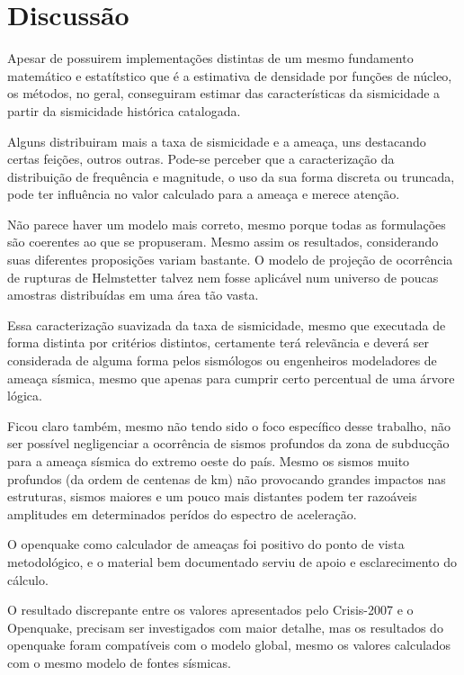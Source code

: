 \chapter{Discussão}
\label{cap:conclusoes}

Apesar de possuirem implementações distintas de um mesmo fundamento matemático e estatítstico
que é a estimativa de densidade por funções de núcleo, os métodos, no geral, conseguiram
estimar das características da sismicidade a partir da sismicidade histórica catalogada.

Alguns distribuiram mais a taxa de sismicidade e a ameaça, uns destacando certas feições, outros outras.
Pode-se perceber que a caracterização da distribuição de frequência e magnitude, o uso da sua forma discreta 
ou truncada, pode ter influência no valor calculado para a ameaça e merece atenção.

Não parece haver um modelo mais correto, mesmo
porque todas as formulações são coerentes ao que se propuseram. Mesmo assim
os resultados, considerando suas diferentes proposições variam bastante.
O modelo de projeção de ocorrência de rupturas de Helmstetter talvez nem
fosse aplicável num universo de poucas amostras distribuídas em uma área tão vasta.

Essa caracterização suavizada da taxa de sismicidade, mesmo que executada de forma
distinta por critérios distintos, certamente terá relevãncia e deverá ser considerada
de alguma forma pelos sismólogos ou engenheiros modeladores de ameaça sísmica,
mesmo que apenas para cumprir certo percentual de uma árvore lógica.

Ficou claro também, mesmo não tendo sido o foco específico desse trabalho, 
não ser possível negligenciar a ocorrência de sismos profundos da zona de 
subducção para a ameaça sísmica do extremo oeste do país. Mesmo os sismos muito profundos (da ordem de centenas de km)
não provocando grandes impactos nas estruturas, sismos maiores e um pouco mais distantes podem ter razoáveis amplitudes em determinados perídos do espectro de aceleração.

O openquake como calculador de ameaças foi positivo do ponto de vista metodológico,
e o material bem documentado serviu de apoio e esclarecimento do cálculo.

O resultado discrepante entre os valores apresentados pelo Crisis-2007 e o Openquake,
precisam ser investigados com maior detalhe, mas os resultados do openquake foram compatíveis com o
modelo global, mesmo os valores calculados com o mesmo modelo de fontes sísmicas.

